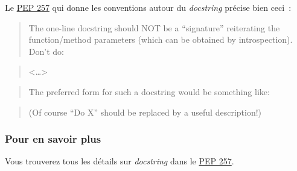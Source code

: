 Le \href{http://legacy.python.org/dev/peps/pep-0257/}{PEP 257} qui donne
les conventions autour du \emph{docstring} précise bien ceci~:

    \begin{quote}
The one-line docstring should NOT be a ``signature'' reiterating the
function/method parameters (which can be obtained by introspection).
Don't do:
\end{quote}

\begin{Shaded}
\begin{Highlighting}[frame=lines,framerule=0.6mm,rulecolor=\color{asisframecolor}]
\end{Highlighting}
\end{Shaded}

\begin{quote}
\textless{}\ldots{}\textgreater{}
\end{quote}

\begin{quote}
The preferred form for such a docstring would be something like:
\end{quote}

\begin{Shaded}
\begin{Highlighting}[frame=lines,framerule=0.6mm,rulecolor=\color{asisframecolor}]
\end{Highlighting}
\end{Shaded}

\begin{quote}
(Of course ``Do X'' should be replaced by a useful description!)
\end{quote}

    \hypertarget{pour-en-savoir-plus}{%
\subsubsection{Pour en savoir plus}\label{pour-en-savoir-plus}}

    Vous trouverez tous les détails sur \emph{docstring} dans le
\href{http://legacy.python.org/dev/peps/pep-0257/}{PEP 257}.


    
    
    
